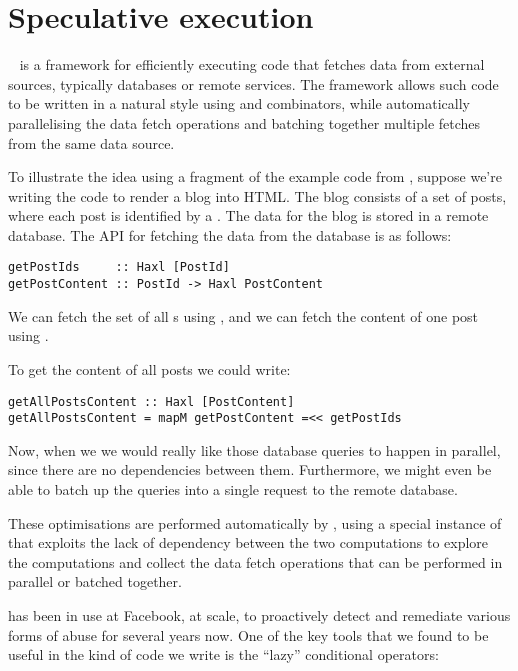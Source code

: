 \section{Speculative execution}\label{sec-haxl}

\Haxl~\citep{marlow2014haxl} is a framework for efficiently executing code that
fetches data from external sources, typically databases or remote
services. The \Haxl framework allows such code to be written in a
natural style using  and  combinators, while
automatically parallelising the data fetch operations and batching
together multiple fetches from the same data source.

To illustrate the idea using a fragment of the example code from
\citep{marlow2014haxl}, suppose we're writing the code to render a blog into
HTML. The blog consists of a set of posts, where each post is
identified by a .  The data for the blog is stored in a
remote database.  The API for fetching the data from the database is
as follows:

\begin{verbatim}
getPostIds     :: Haxl [PostId]
getPostContent :: PostId -> Haxl PostContent
\end{verbatim}

We can fetch the set of all s using , and we
can fetch the content of one post using .

To get the content of all posts we could write:

\begin{verbatim}
getAllPostsContent :: Haxl [PostContent]
getAllPostsContent = mapM getPostContent =<< getPostIds
\end{verbatim}

Now, when we  we would really like those
database queries to happen in parallel, since there are no
dependencies between them. Furthermore, we might even be able to batch
up the queries into a single request to the remote database.

These optimisations are performed automatically by \Haxl, using a
special instance of  that exploits the lack of dependency
between the two computations to explore the computations and collect
the data fetch operations that can be performed in parallel or batched
together.

\Haxl has been in use at Facebook, at scale, to proactively detect and
remediate various forms of abuse for several years now.  One of the
key tools that we found to be useful in the kind of code we write is
the ``lazy'' conditional operators:


